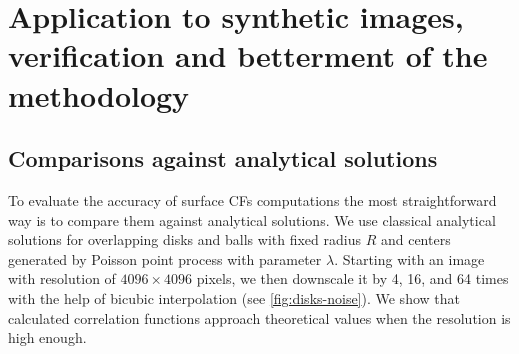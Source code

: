 \documentclass[reprint,amsmath,amssymb,aps,pre,showkeys,showpacs]{revtex4-1}
\begin{document}
\section{Application to synthetic images, verification and betterment of the methodology}
\label{sec:results}
\subsection{Comparisons against analytical solutions}
\label{sec:comparison}
To evaluate the accuracy of surface CFs computations the most straightforward
way is to compare them against analytical solutions. We use classical
analytical solutions for overlapping disks and balls with fixed radius $R$ and
centers generated by Poisson point process with parameter $\lambda$. Starting
with an image with resolution of $4096 \times 4096$ pixels, we then downscale it
by 4, 16, and 64 times with the help of bicubic interpolation
\cite{ledesma2018effect} (see \cref{fig:disks-noise}). We show that calculated
correlation functions approach theoretical values when the resolution is high
enough.
\end{document}
